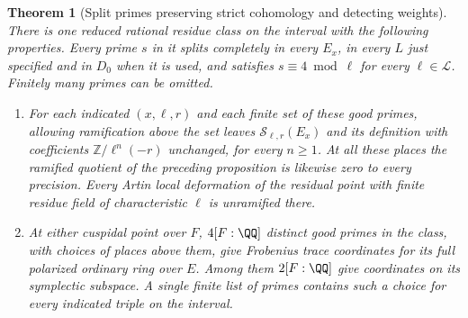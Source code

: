 \documentclass[a4paper,11pt]{article}
\newtheorem{theorem}[proposition]{Theorem}
\theoremstyle{definition}
\theoremstyle{remark}
\newcommand{\ZZ}{\mathbb Z}\newcommand{\ord}{\operatorname{ord}}
\numberwithin{equation}{section}
\begin{document}
\begin{theorem}[Split primes preserving strict cohomology and detecting weights]
\leavevmode\label{thm:commonprobes594}
There is one reduced rational residue class on the interval
with the following properties. Every prime \(s\) in it splits
completely in every \(E_x\), in every \(L\) just specified and
in \(D_0\) when it is used, and satisfies \(s\equiv4\bmod\ell\) for every
\(\ell\in\mathcal L\). Finitely many primes can be omitted.
\begin{enumerate}
\item For each indicated \((x,\ell,r)\) and each finite set of
these good primes, allowing ramification above the set leaves
\(\mathcal S_{\ell,r}(E_x)\) and its definition with coefficients
\(\ZZ/\ell^n(-r)\) unchanged, for every \(n\ge1\).
At all these places the ramified quotient of the preceding
proposition is likewise zero to every precision. Every Artin
local deformation of the residual point with finite residue
field of characteristic \(\ell\) is unramified there.
\item At either cuspidal point over \(F\), \(4[F:\QQ]\) distinct
good primes in the class, with choices of places above them,
give Frobenius trace coordinates for its full polarized
ordinary ring over \(E\). Among them \(2[F:\QQ]\) give
coordinates on its symplectic subspace. A single finite list
of primes contains such a choice for every indicated triple
on the interval.
\end{enumerate}
\end{theorem}
\end{document}
